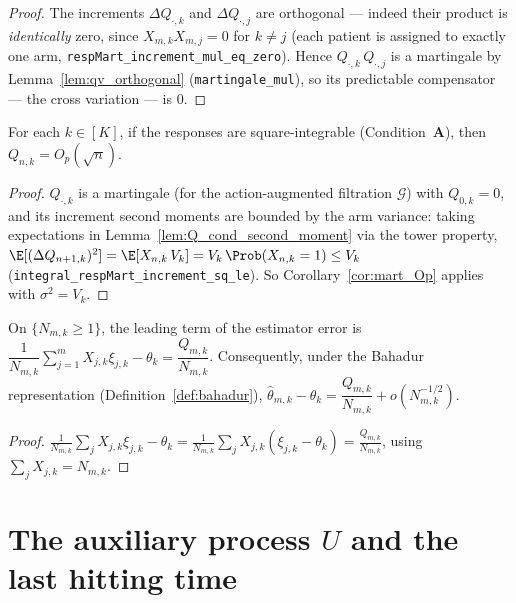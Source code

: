 \begin{proof}\leanok
{}
The increments $\Delta Q_{\cdot,k}$ and $\Delta Q_{\cdot,j}$ are orthogonal --- indeed their
product is \emph{identically} zero, since $X_{m,k}X_{m,j} = 0$ for $k \ne j$ (each patient is
assigned to exactly one arm, \texttt{respMart\_increment\_mul\_eq\_zero}). Hence
$Q_{\cdot,k}\,Q_{\cdot,j}$ is a martingale by Lemma~\ref{lem:qv_orthogonal}
(\texttt{martingale\_mul}), so its predictable compensator --- the cross variation --- is $0$.
\end{proof}

\begin{lemma}\label{lem:Q_Op}
\leanok
{}
For each $k \in [K]$, if the responses are square-integrable (Condition~\textbf{A}), then
$Q_{n,k} = O_p(\sqrt n)$.
\end{lemma}

\begin{proof}\leanok
{}
$Q_{\cdot,k}$ is a martingale (for the action-augmented filtration $\mathcal{G}$) with
$Q_{0,k}=0$, and its increment second moments are bounded by the arm variance: taking
expectations in Lemma~\ref{lem:Q_cond_second_moment} via the tower property,
$\E[(\Delta Q_{n+1,k})^2] = \E[X_{n,k}\,V_k] = V_k\,\Prob(X_{n,k}=1) \le V_k$
(\texttt{integral\_respMart\_increment\_sq\_le}). So Corollary~\ref{cor:mart_Op} applies with
$\sigma^2 = V_k$.
\end{proof}

\begin{lemma}\label{lem:theta_error_Q}
\leanok
{}
On $\{N_{m,k}\ge1\}$, the leading term of the estimator error is
$\dfrac{1}{N_{m,k}}\sum_{j=1}^m X_{j,k}\xi_{j,k} - \theta_k
 = \dfrac{Q_{m,k}}{N_{m,k}}$.
Consequently, under the Bahadur representation
(Definition~\ref{def:bahadur}),
$\hat{\theta}_{m,k} - \theta_k = \dfrac{Q_{m,k}}{N_{m,k}} + o(N_{m,k}^{-1/2})$.
\end{lemma}

\begin{proof}
$\frac{1}{N_{m,k}}\sum_j X_{j,k}\xi_{j,k} - \theta_k
= \frac{1}{N_{m,k}}\sum_j X_{j,k}(\xi_{j,k}-\theta_k)
= \frac{Q_{m,k}}{N_{m,k}}$, using $\sum_j X_{j,k} = N_{m,k}$.
\leanok
\end{proof}

\section{The auxiliary process \texorpdfstring{$U$}{U} and the last hitting time}
\label{sec:aux_U}

